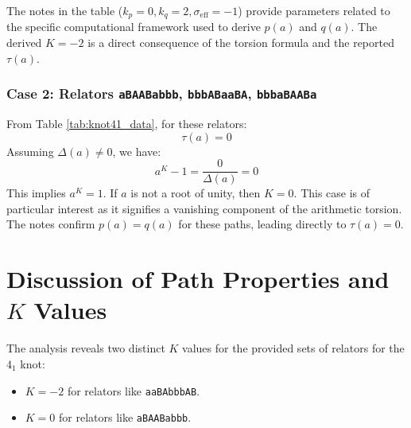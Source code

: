 \documentclass{article}
\begin{document}
The notes in the table ($k_p=0, k_q=2, \sigma_{\text{eff}}=-1$) provide parameters related to the specific computational framework used to derive $p(a)$ and $q(a)$. The derived $K=-2$ is a direct consequence of the torsion formula and the reported $\tau(a)$.

\subsubsection{Case 2: Relators \texttt{aBAABabbb}, \texttt{bbbABaaBA}, \texttt{bbbaBAABa}}
From Table \ref{tab:knot41_data}, for these relators:
\[ \tau(a) = 0 \]
Assuming $\Delta(a) \neq 0$, we have:
\[ a^K-1 = \frac{0}{\Delta(a)} = 0 \]
This implies $a^K = 1$. If $a$ is not a root of unity, then $K=0$.
This case is of particular interest as it signifies a vanishing component of the arithmetic torsion. The notes confirm $p(a)=q(a)$ for these paths, leading directly to $\tau(a)=0$.

\section{Discussion of Path Properties and $K$ Values}

The analysis reveals two distinct $K$ values for the provided sets of relators for the $4_1$ knot:
\begin{itemize}
    \item $K = -2$ for relators like \texttt{aaBAbbbAB}.
    \item $K = 0$ for relators like \texttt{aBAABabbb}.
\end{itemize}
\end{document}
